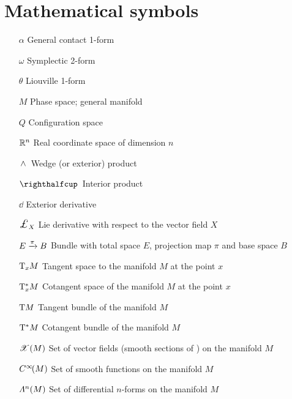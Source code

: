 \section*{Mathematical symbols}
\begin{itemize}[itemsep=0pt, leftmargin=2cm, labelsep=0cm, labelwidth=1.9cm, align=left]
    \item[$\alpha$] General contact 1-form
    \item[$\omega$] Symplectic 2-form
    \item[$\theta$] Liouville 1-form
%
    \item[$M$] Phase space; general manifold
    \item[$Q$] Configuration space
%
    \item[$\mathbb{R}^n$] Real coordinate space of dimension $n$
%
%
    \item[$ \,\wedge\, $]  Wedge (or exterior) product
    \item[$\intpr{}{}$]  Interior product
    \item[$\dd{}$]  Exterior derivative
    \item[$\lied{X}{}$]  Lie derivative with respect to the vector field $X$
    \item[$E\xrightarrow[]{\pi}B$]  Bundle with total space $E$, projection map $\pi$ and base space $B$
    \item[$\mathrm{T}_{x}M$]  Tangent space to the manifold $M$ at the point $x$
    \item[$\mathrm{T}_{x}^*M$]  Cotangent space of the manifold $M$ at the point $x$
    \item[$\mathrm{T}M$]  Tangent bundle of the manifold $M$
    \item[$\mathrm{T}^*M$]  Cotangent bundle of the manifold $M$
    \item[$\mathscr{X}\qty(M)$]  Set of vector fields (smooth sections of ) on the manifold $M$
    \item[$C^\infty\!\qty(M)$]  Set of smooth functions on the manifold $M$
    \item[$\Lambda^{n}(M)$]  Set of differential $n$-forms on the manifold $M$
\end{itemize}
